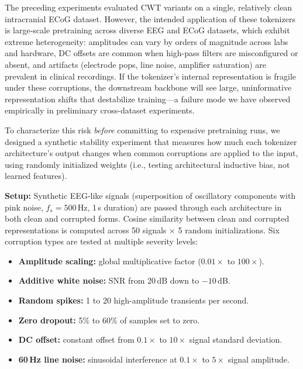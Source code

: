 \documentclass[11pt, a4paper]{article}
\begin{document}
The preceding experiments evaluated CWT variants on a single,
relatively clean intracranial ECoG dataset.  However, the intended
application of these tokenizers is large-scale pretraining across
diverse EEG and ECoG datasets, which exhibit extreme heterogeneity:
amplitudes can vary by orders of magnitude across labs and hardware,
DC offsets are common when high-pass filters are misconfigured or
absent, and artifacts (electrode pops, line noise, amplifier
saturation) are prevalent in clinical recordings.  If the tokenizer's
internal representation is fragile under these corruptions, the
downstream backbone will see large, uninformative representation
shifts that destabilize training---a failure mode we have observed
empirically in preliminary cross-dataset experiments.

To characterize this risk \emph{before} committing to expensive
pretraining runs, we designed a synthetic stability experiment that
measures how much each tokenizer architecture's output changes when
common corruptions are applied to the input, using randomly
initialized weights (i.e., testing architectural inductive bias, not
learned features).

\textbf{Setup:} Synthetic EEG-like signals (superposition of
oscillatory components with pink noise, $f_s = 500$\,Hz, 1\,s
duration) are passed through each architecture in both clean and
corrupted forms.  Cosine similarity between clean and corrupted
representations is computed across 50 signals $\times$ 5 random
initializations.  Six corruption types are tested at multiple
severity levels:

\begin{itemize}[nosep]
      \item \textbf{Amplitude scaling:} global multiplicative factor
            ($0.01\times$ to $100\times$).
      \item \textbf{Additive white noise:} SNR from 20\,dB down to
            $-10$\,dB.
      \item \textbf{Random spikes:} 1 to 20 high-amplitude transients
            per second.
      \item \textbf{Zero dropout:} 5\% to 60\% of samples set to zero.
      \item \textbf{DC offset:} constant offset from $0.1\times$ to
            $10\times$ signal standard deviation.
      \item \textbf{60\,Hz line noise:} sinusoidal interference at
            $0.1\times$ to $5\times$ signal amplitude.
\end{itemize}
\end{document}
